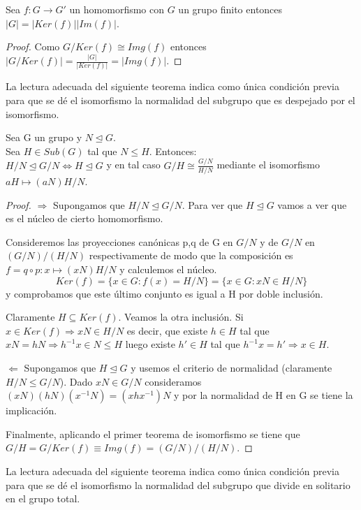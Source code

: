 \begin{ncor}
Sea $f:G \rightarrow G'$ un homomorfismo con $G$ un grupo finito entonces $|G| = |Ker(f)||Im(f)|$.
\end{ncor}
\begin{proof}
Como $G/Ker(f) \cong Img(f)$ entonces $|G/Ker(f)| = \frac{|G|}{|Ker(f)|} = |Img(f)|$.
\end{proof}

La lectura adecuada del siguiente teorema indica como única condición previa para que se dé el isomorfismo la normalidad del subgrupo que es despejado por el isomorfismo.

\begin{nth}
Sea G un grupo y $N \trianglelefteq G$.\\ Sea $H \in Sub(G)$ tal que $N \le H$. Entonces:\\
$H/N \trianglelefteq G/N \iff H \trianglelefteq G$ y en tal caso $G/H \cong \frac{G/N}{H/N}$ mediante el isomorfismo $aH \mapsto (aN)H/N$.
\end{nth}
\begin{proof}
$\Rightarrow$ Supongamos que $H/N \trianglelefteq G/N$. Para ver que $H \trianglelefteq G$ vamos a ver que es el núcleo de cierto homomorfismo.

Consideremos las proyecciones canónicas p,q de G en $G/N$ y de $G/N$ en $(G/N)/(H/N)$ respectivamente de modo que la composición es $f=q \circ p:x \mapsto (xN)H/N$ y calculemos el núcleo. $$Ker(f) = \{x \in G:f(x) = H/N\} = \{x \in G:xN \in H/N\}$$ y comprobamos que este último conjunto es igual a H por doble inclusión.

Claramente $H \subseteq Ker(f)$. Veamos la otra inclusión. Si $x \in Ker(f) \Rightarrow xN \in H/N$ es decir, que existe $h \in H$ tal que $xN = hN \Rightarrow h^{-1}x \in N \le H$ luego existe $h' \in H$ tal que $h^{-1}x = h' \Rightarrow x \in H$.

$\Leftarrow$ Supongamos que $H \trianglelefteq G$ y usemos el criterio de normalidad (claramente $H/N \le G/N$). Dado $xN \in G/N$ consideramos $(xN)(hN)(x^{-1}N) = (xhx^{-1})N$ y por la normalidad de H en G se tiene la implicación.

Finalmente, aplicando el primer teorema de isomorfismo se tiene que $G/H = G/Ker(f)  \equiv Img(f) = (G/N)/(H/N)$.
\end{proof}

La lectura adecuada del siguiente teorema indica como única condición previa para que se dé el isomorfismo la normalidad del subgrupo que divide en solitario en el grupo total.


